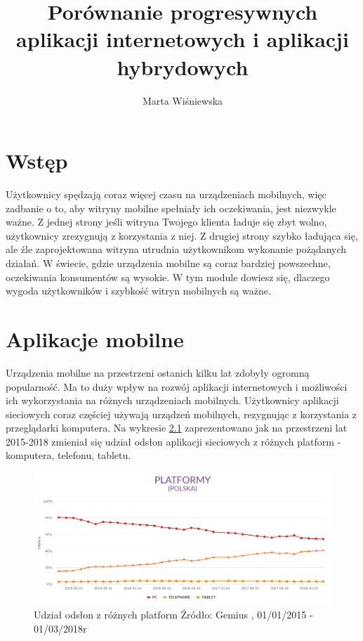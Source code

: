 \documentclass[a4paper,12pt,twoside,openany]{report}
\title{Porównanie progresywnych aplikacji internetowych i aplikacji hybrydowych}
\author{Marta Wi\'sniewska}
\begin{document}
\maketitle

\chapter{Wstęp}
Użytkownicy spędzają coraz więcej czasu na urządzeniach mobilnych, więc zadbanie o to, aby witryny mobilne spełniały ich oczekiwania, jest niezwykle ważne. Z jednej strony jeśli witryna Twojego klienta ładuje się zbyt wolno, użytkownicy zrezygnują z korzystania z niej. Z drugiej strony szybko ładująca się, ale źle zaprojektowana witryna utrudnia użytkownikom wykonanie pożądanych działań. W świecie, gdzie urządzenia mobilne są coraz bardziej powszechne, oczekiwania konsumentów są wysokie. W tym module dowiesz się, dlaczego wygoda użytkowników i szybkość witryn mobilnych są ważne.



\chapter {Aplikacje mobilne}
Urządzenia mobilne na przestrzeni ostanich kilku lat zdobyły ogromną popularno\'sć. Ma to duży wpływ na rozwój aplikacji internetowych i możliwo\'sci ich wykorzystania na różnych urządzeniach mobilnych. Użytkownicy aplikacji sieciowych coraz czę\'sciej używają urządzeń mobilnych, rezygnując z korzystania z przeglądarki komputera. Na wykresie \ref{fig:plot1} zaprezentowano jak na przestrzeni lat 2015-2018 zmieniał się udział odsłon aplikacji sieciowych z różnych platform - komputera, telefonu, tabletu. 
\begin{figure}[h]
    \centering
    \includegraphics[width=1\textwidth]{rys/Platformy.png}
    \caption{Udział odsłon z różnych platform \newline Źródło: Gemius \cite{platformy}, 01/01/2015 - 01/03/2018r}
    \label{fig:plot1}
\end{figure}
\end{document}
